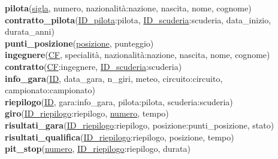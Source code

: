 \documentclass[a4paper,12pt]{report}
\begin{document}
{{			\textbf{pilota}(\underline{sigla}, numero, nazionalità:nazione, nascita, nome, cognome)\\
			\textbf{contratto\_pilota}(\underline{ID\_pilota}:pilota, \underline{ID\_scuderia}:scuderia, data\_inizio, \tab\tab durata\_anni)\\
			\textbf{punti\_posizione}(\underline{posizione}, punteggio)\\
			\textbf{ingegnere}(\underline{CF}, specialità, nazionalità:nazione, nascita, nome, cognome)\\
			\textbf{contratto}(\underline{CF}:ingegnere, \underline{ID\_scuderia}:scuderia)\\
			\textbf{info\_gara}(\underline{ID}, data\_gara, n\_giri, meteo, circuito:circuito, campionato:campionato)\\
			\textbf{riepilogo}(\underline{ID}, gara:info\_gara, pilota:pilota, scuderia:scuderia)\\
			\textbf{giro}(\underline{ID\_riepilogo}:riepilogo, \underline{numero}, tempo)\\
			\textbf{risultati\_gara}(\underline{ID\_riepilogo}:riepilogo, posizione:punti\_posizione, stato)\\
			\textbf{risultati\_qualifica}(\underline{ID\_riepilogo}:riepilogo, posizione, tempo)\\
			\textbf{pit\_stop}(\underline{numero}, \underline{ID\_riepilogo}:riepilogo, durata)\\}
}
\end{document}
